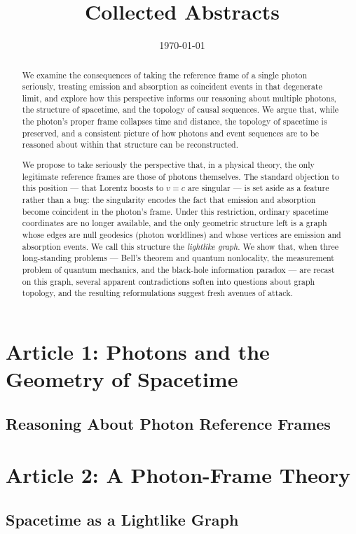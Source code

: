 \documentclass[11pt]{article}
\title{Collected Abstracts}
\date{\today}
\begin{document}
\maketitle

\section*{Article 1: Photons and the Geometry of Spacetime}
\subsection*{Reasoning About Photon Reference Frames}

\begin{abstract}
We examine the consequences of taking the reference frame of a single photon seriously, treating emission and absorption as coincident events in that degenerate limit, and explore how this perspective informs our reasoning about multiple photons, the structure of spacetime, and the topology of causal sequences. We argue that, while the photon's proper frame collapses time and distance, the topology of spacetime is preserved, and a consistent picture of how photons and event sequences are to be reasoned about within that structure can be reconstructed.
\end{abstract}

\section*{Article 2: A Photon-Frame Theory}
\subsection*{Spacetime as a Lightlike Graph}

\begin{abstract}
We propose to take seriously the perspective that, in a physical theory, the only legitimate reference frames are those of photons themselves. The standard objection to this position --- that Lorentz boosts to $v = c$ are singular --- is set aside as a feature rather than a bug: the singularity encodes the fact that emission and absorption become coincident in the photon's frame. Under this restriction, ordinary spacetime coordinates are no longer available, and the only geometric structure left is a graph whose edges are null geodesics (photon worldlines) and whose vertices are emission and absorption events. We call this structure the \emph{lightlike graph}. We show that, when three long-standing problems --- Bell's theorem and quantum nonlocality, the measurement problem of quantum mechanics, and the black-hole information paradox --- are recast on this graph, several apparent contradictions soften into questions about graph topology, and the resulting reformulations suggest fresh avenues of attack.
\end{abstract}
\end{document}
